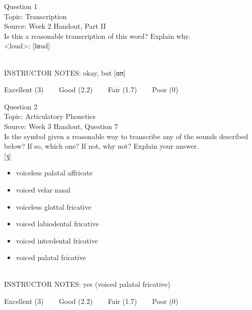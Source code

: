 \documentclass[12pt]{article}
\begin{document}
\begin{center}
\textbf{{\color{blue}{\HUGE START OF EXAM\\}}}

\textbf{{\color{blue}{\HUGE Student ID: 36593\\}}}

\textbf{{\color{blue}{\HUGE \\}}}

\end{center}
\newpage

{\large Question 1}\\

Topic: Transcription\\
Source: Week 2 Handout, Part II\\

Is this a reasonable transcription of this word? Explain why.\\

<loud>: {[lɑud]}


~\\
INSTRUCTOR NOTES: okay, but [ɑʊ]


\vfill
Excellent (3) ~~~ Good (2.2) ~~~ Fair (1.7) ~~~ Poor (0)
\newpage

{\large Question 2}\\

Topic: Articulatory Phonetics\\
Source: Week 3 Handout, Question 7\\

Is the symbol given a reasonable way to transcribe any of the sounds described below? If so, which one? If not, why not? Explain your answer.\\

{[ʒ]}

\begin{itemize} \item voiceless palatal affricate \item voiced velar nasal \item voiceless glottal fricative \item voiced labiodental fricative \item voiced interdental fricative \item voiced palatal fricative \end{itemize}


~\\
INSTRUCTOR NOTES: yes (voiced palatal fricative)


\vfill
Excellent (3) ~~~ Good (2.2) ~~~ Fair (1.7) ~~~ Poor (0)
\newpage
\end{document}
